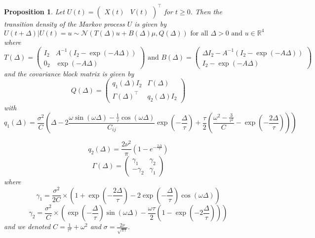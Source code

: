 \documentclass[11pt]{article}
\newcommand {\R}{\mathbb{R}}
\newcommand {\1}{\mathbb{1}}
\newtheorem{proposition}{Proposition}[section]
\theoremstyle{definition}
\theoremstyle{remark}
\theoremstyle{remark}
\begin{document}
\begin{proposition}
	Let $U(t)=\begin{pmatrix} X(t) & V(t) \end{pmatrix}^\top$ for $t \geq 0$. Then the transition density of the Markov process $U$ is given by 
	\begin{equation}
		U(t+\Delta) \vert U(t)=u \sim \mathcal{N}\left( T(\Delta) u +B(\Delta)\mu, Q(\Delta)\right) \mbox{ for all } \Delta>0 \mbox{ and } u \in \R^4
		\label{eq: X V distribution}
	\end{equation}
where \begin{equation}
	T(\Delta)=\begin{pmatrix} I_2 & A^{-1}(I_2-\exp(-A\Delta)) \\
	0_2 & \exp(-A\Delta) \end{pmatrix} \mbox{ and } B(\Delta)=\begin{pmatrix}
	\Delta I_2 -A^{-1}(I_2-\exp(-A\Delta))\\
	I_2-\exp(-A\Delta)\end{pmatrix}
	\label{eq: link matrices}
	\end{equation}
and the covariance block matrix is given by
\begin{equation}
	Q(\Delta)=\begin{pmatrix}
		q_1(\Delta)I_2 & \Gamma(\Delta) \\
		\Gamma(\Delta)^\top & q_2(\Delta)I_2
	\end{pmatrix}
	\label{eq: covariance matrix}
\end{equation}
with 
\begin{equation}q_1(\Delta)=\frac{\sigma^2}{C}\left( \Delta-2 \frac{\omega \sin(\omega \Delta)-\frac{1}{\tau} \cos(\omega \Delta)}{C_{ij} } \exp\left( -\frac{\Delta}{\tau} \right) +\frac{\tau}{2} \left( \frac{\omega^2-\frac{3}{\tau^2}}{C}-\exp\left( -\frac{2\Delta}{\tau}\right)\right) \right)
\end{equation}

\begin{equation}
	q_2(\Delta)=\frac{2\nu^2}{\pi}\left(1-e^{-\frac{2 \Delta}{\tau}}\right)
\end{equation}
\begin{equation}\Gamma(\Delta)=\begin{pmatrix} \gamma_1 & \gamma_2 \\
	-\gamma_2 & \gamma_1\end{pmatrix}
\end{equation}
where
\begin{equation}\gamma_1=\frac{\sigma^2}{2 C } \times \left( 1+\exp\left( -\frac{2\Delta}{\tau}\right)-2\exp\left( -\frac{\Delta}{\tau}\right) \cos(\omega\Delta)\right)
\end{equation}
\begin{equation}\gamma_2=\frac{\sigma^2}{C} \times\left( \exp\left( -\frac{\Delta}{\tau}\right) \sin(\omega \Delta)-\frac{\omega \tau}{2} \left(1-\exp\left( -2 \frac{\Delta}{\tau}\right) \right)\right)
\end{equation}
and we denoted $C=\frac{1}{\tau^2}+\omega^2$ and $\sigma=\frac{2\nu}{\sqrt{\pi \tau}}$.
\label{prop: transition density}
\end{proposition}
\end{document}

